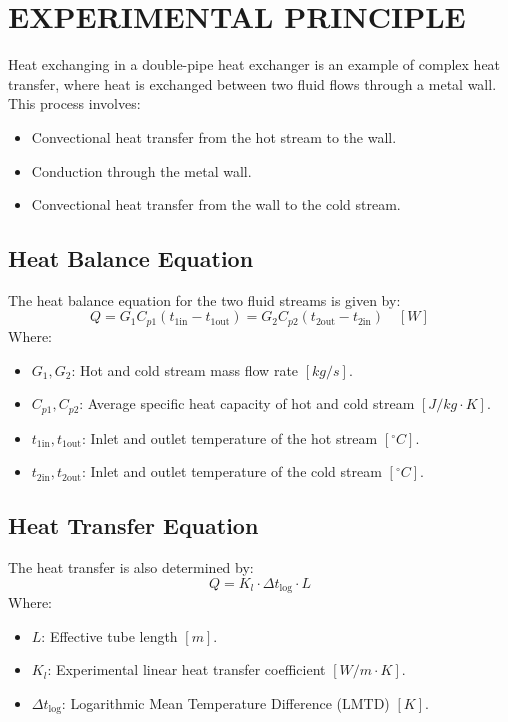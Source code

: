 \section{EXPERIMENTAL PRINCIPLE}\label{experimental-principle}

Heat exchanging in a double-pipe heat exchanger is an example of complex heat transfer, where heat is exchanged between two fluid flows through a metal wall. This process involves:
\begin{itemize}
    \item Convectional heat transfer from the hot stream to the wall.
    \item Conduction through the metal wall.
    \item Convectional heat transfer from the wall to the cold stream.
\end{itemize}

\subsection{Heat Balance Equation}\label{heat-balance-equation}

The heat balance equation for the two fluid streams is given by:
\begin{equation}
    Q = G_1 C_{p1}(t_{1\text{in}} - t_{1\text{out}}) = G_2 C_{p2}(t_{2\text{out}} - t_{2\text{in}}) \quad [W]
\end{equation}
Where:
\begin{itemize}
    \item $G_1, G_2$: Hot and cold stream mass flow rate $[kg/s]$.
    \item $C_{p1}, C_{p2}$: Average specific heat capacity of hot and cold stream $[J/kg \cdot K]$.
    \item $t_{1\text{in}}, t_{1\text{out}}$: Inlet and outlet temperature of the hot stream $[^\circ C]$.
    \item $t_{2\text{in}}, t_{2\text{out}}$: Inlet and outlet temperature of the cold stream $[^\circ C]$.
\end{itemize}

\subsection{Heat Transfer Equation}\label{heat-transfer-equation}

The heat transfer is also determined by:
\begin{equation}
    Q = K_l \cdot \Delta t_{\text{log}} \cdot L
\end{equation}
Where:
\begin{itemize}
    \item $L$: Effective tube length $[m]$.
    \item $K_l$: Experimental linear heat transfer coefficient $[W/m \cdot K]$.
    \item $\Delta t_{\text{log}}$: Logarithmic Mean Temperature Difference (LMTD) $[K]$.
\end{itemize}

